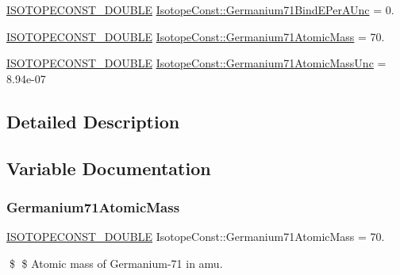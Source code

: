 \begin{DoxyCompactItemize}
\mbox{\hyperlink{group___isotope_const-_macros_ga8f45a7272ce02c0b4c65c44636ed719a}{I\+S\+O\+T\+O\+P\+E\+C\+O\+N\+S\+T\+\_\+\+D\+O\+U\+B\+LE}} \mbox{\hyperlink{group___isotope_const-_germanium-_ge71_gaf27fb3d1c1a6662e68dcef25d527f757}{Isotope\+Const\+::\+Germanium71\+Bind\+E\+Per\+A\+Unc}} = 0.
\item 
\mbox{\hyperlink{group___isotope_const-_macros_ga8f45a7272ce02c0b4c65c44636ed719a}{I\+S\+O\+T\+O\+P\+E\+C\+O\+N\+S\+T\+\_\+\+D\+O\+U\+B\+LE}} \mbox{\hyperlink{group___isotope_const-_germanium-_ge71_gab7230a5a3ad61ac94dbe2988a3207e2a}{Isotope\+Const\+::\+Germanium71\+Atomic\+Mass}} = 70.
\item 
\mbox{\hyperlink{group___isotope_const-_macros_ga8f45a7272ce02c0b4c65c44636ed719a}{I\+S\+O\+T\+O\+P\+E\+C\+O\+N\+S\+T\+\_\+\+D\+O\+U\+B\+LE}} \mbox{\hyperlink{group___isotope_const-_germanium-_ge71_ga78ef56db144f6ac40117e8acaebc5eed}{Isotope\+Const\+::\+Germanium71\+Atomic\+Mass\+Unc}} = 8.\+94e-\/07
\end{DoxyCompactItemize}


\subsection{Detailed Description}


\subsection{Variable Documentation}
\mbox{\label{group___isotope_const-_germanium-_ge71_gab7230a5a3ad61ac94dbe2988a3207e2a}} 
\subsubsection{\texorpdfstring{Germanium71\+Atomic\+Mass}{Germanium71AtomicMass}}
{\footnotesize\ttfamily \mbox{\hyperlink{group___isotope_const-_macros_ga8f45a7272ce02c0b4c65c44636ed719a}{I\+S\+O\+T\+O\+P\+E\+C\+O\+N\+S\+T\+\_\+\+D\+O\+U\+B\+LE}} Isotope\+Const\+::\+Germanium71\+Atomic\+Mass = 70.}

\$ \$ Atomic mass of Germanium-\/71 in amu. \mbox{\label{group___isotope_const-_germanium-_ge71_ga78ef56db144f6ac40117e8acaebc5eed}} 
